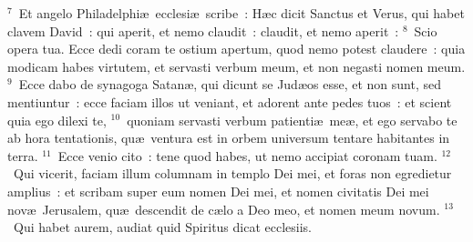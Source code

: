 ${}^{7}$~Et angelo Philadelphi\ae\ ecclesi\ae\ scribe~: H\ae c dicit Sanctus et Verus, qui habet clavem David~: qui aperit, et nemo claudit~: claudit, et nemo aperit~:
${}^{8}$~Scio opera tua. Ecce dedi coram te ostium apertum, quod nemo potest claudere~: quia modicam habes virtutem, et servasti verbum meum, et non negasti nomen meum.
${}^{9}$~Ecce dabo de synagoga Satan\ae , qui dicunt se Jud\ae os esse, et non sunt, sed mentiuntur~: ecce faciam illos ut veniant, et adorent ante pedes tuos~: et scient quia ego dilexi te,
${}^{10}$~quoniam servasti verbum patienti\ae\ me\ae , et ego servabo te ab hora tentationis, qu\ae\ ventura est in orbem universum tentare habitantes in terra.
${}^{11}$~Ecce venio cito~: tene quod habes, ut nemo accipiat coronam tuam.
${}^{12}$~Qui vicerit, faciam illum columnam in templo Dei mei, et foras non egredietur amplius~: et scribam super eum nomen Dei mei, et nomen civitatis Dei mei nov\ae\ Jerusalem, qu\ae\ descendit de c\ae lo a Deo meo, et nomen meum novum.
${}^{13}$~Qui habet aurem, audiat quid Spiritus dicat ecclesiis.


